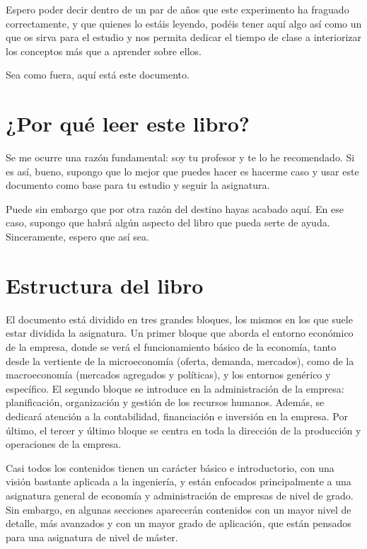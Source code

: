 \documentclass[
]{krantz}
\begin{document}
Espero poder decir dentro de un par de años que este experimento ha fraguado correctamente, y que quienes lo estáis leyendo, podéis tener aquí algo así como un que os sirva para el estudio y nos permita dedicar el tiempo de clase a interiorizar los conceptos más que a aprender sobre ellos.

Sea como fuera, aquí está este documento.

\hypertarget{por-quuxe9-leer-este-libro}{%
\section*{¿Por qué leer este libro?}\label{por-quuxe9-leer-este-libro}}


Se me ocurre una razón fundamental: soy tu profesor y te lo he recomendado. Si es así, bueno, supongo que lo mejor que puedes hacer es hacerme caso y usar este documento como base para tu estudio y seguir la asignatura.

Puede sin embargo que por otra razón del destino hayas acabado aquí. En ese caso, supongo que habrá algún aspecto del libro que pueda serte de ayuda. Sinceramente, espero que así sea.

\hypertarget{estructura-del-libro}{%
\section*{Estructura del libro}\label{estructura-del-libro}}


El documento está dividido en tres grandes bloques, los mismos en los que suele estar dividida la asignatura. Un primer bloque que aborda el entorno económico de la empresa, donde se verá el funcionamiento básico de la economía, tanto desde la vertiente de la microeconomía (oferta, demanda, mercados), como de la macroeconomía (mercados agregados y políticas), y los entornos genérico y específico. El segundo bloque se introduce en la administración de la empresa: planificación, organización y gestión de los recursos humanos. Además, se dedicará atención a la contabilidad, financiación e inversión en la empresa. Por último, el tercer y último bloque se centra en toda la dirección de la producción y operaciones de la empresa.

Casi todos los contenidos tienen un carácter básico e introductorio, con una visión bastante aplicada a la ingeniería, y están enfocados principalmente a una asignatura general de economía y administración de empresas de nivel de grado. Sin embargo, en algunas secciones aparecerán contenidos con un mayor nivel de detalle, más avanzados y con un mayor grado de aplicación, que están pensados para una asignatura de nivel de máster.
\end{document}
